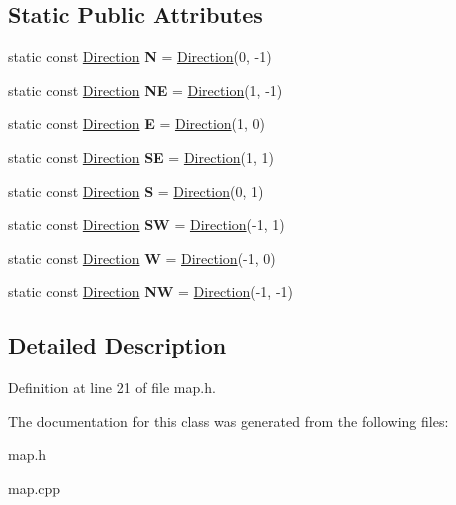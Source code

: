 \subsection*{Static Public Attributes}
\begin{DoxyCompactItemize}
\item 
\hypertarget{class_direction_a1d2dd636bd6f3aaf40fe2f34ee238d9a}{}\label{class_direction_a1d2dd636bd6f3aaf40fe2f34ee238d9a} 
static const \hyperlink{class_direction}{Direction} {\bfseries N} = \hyperlink{class_direction}{Direction}(0, -\/1)
\item 
\hypertarget{class_direction_a4226b04e6a17c56966d815836fb16f23}{}\label{class_direction_a4226b04e6a17c56966d815836fb16f23} 
static const \hyperlink{class_direction}{Direction} {\bfseries NE} = \hyperlink{class_direction}{Direction}(1, -\/1)
\item 
\hypertarget{class_direction_a326ea5eadf79659502fdf0059ad63921}{}\label{class_direction_a326ea5eadf79659502fdf0059ad63921} 
static const \hyperlink{class_direction}{Direction} {\bfseries E} = \hyperlink{class_direction}{Direction}(1, 0)
\item 
\hypertarget{class_direction_a226e6fcf794e90dc01004c5561f16475}{}\label{class_direction_a226e6fcf794e90dc01004c5561f16475} 
static const \hyperlink{class_direction}{Direction} {\bfseries SE} = \hyperlink{class_direction}{Direction}(1, 1)
\item 
\hypertarget{class_direction_af6e594fc32cf6d282a2fb5148d76fa08}{}\label{class_direction_af6e594fc32cf6d282a2fb5148d76fa08} 
static const \hyperlink{class_direction}{Direction} {\bfseries S} = \hyperlink{class_direction}{Direction}(0, 1)
\item 
\hypertarget{class_direction_a99ffb02dfb1a9cd95270afcc43daecdf}{}\label{class_direction_a99ffb02dfb1a9cd95270afcc43daecdf} 
static const \hyperlink{class_direction}{Direction} {\bfseries SW} = \hyperlink{class_direction}{Direction}(-\/1, 1)
\item 
\hypertarget{class_direction_a6fc63021949a997df043b8aa732fc7f0}{}\label{class_direction_a6fc63021949a997df043b8aa732fc7f0} 
static const \hyperlink{class_direction}{Direction} {\bfseries W} = \hyperlink{class_direction}{Direction}(-\/1, 0)
\item 
\hypertarget{class_direction_ae934adbe5d344690218f8c9c0ccf5d35}{}\label{class_direction_ae934adbe5d344690218f8c9c0ccf5d35} 
static const \hyperlink{class_direction}{Direction} {\bfseries NW} = \hyperlink{class_direction}{Direction}(-\/1, -\/1)
\end{DoxyCompactItemize}


\subsection{Detailed Description}


Definition at line 21 of file map.\+h.



The documentation for this class was generated from the following files\+:\begin{DoxyCompactItemize}
\item 
map.\+h\item 
map.\+cpp\end{DoxyCompactItemize}

